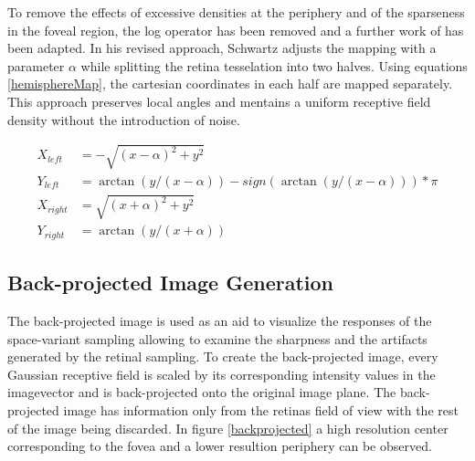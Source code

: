 \documentclass{l4proj}
\begin{document}
To remove the effects of excessive densities at the periphery and of the sparseness in the foveal region, the log operator has been removed and a further work of \citet{Schwartz1980} has been adapted. In his revised approach, Schwartz adjusts the mapping with a parameter $\alpha$ while splitting the retina tesselation into two halves. Using equations \ref{hemisphereMap}, the cartesian coordinates in each half are mapped separately. This approach preserves local angles and mentains a uniform receptive field density without the introduction of noise. 




\begin{align}
    X_{left}  &= -\sqrt{(x-\alpha)^2+y^2}\\ \nonumber
    Y_{left}  &= \arctan(y/(x-\alpha)) - sign(\arctan(y/(x-\alpha)))*\pi\\ \nonumber
    X_{right} &= \sqrt{(x+\alpha)^2+y^2}\\ \nonumber
    Y_{right} &= \arctan(y/(x+\alpha)) 
    \label{hemisphereMap}
\end{align}



\subsection{Back-projected Image Generation}

The back-projected image is used as an aid to visualize the responses of the space-variant sampling allowing to examine the sharpness and the artifacts generated by the retinal sampling. To create the back-projected image, every Gaussian receptive field is scaled by its corresponding intensity values in the imagevector and is back-projected onto the original image plane. The back-projected image has information only from the retinas field of view with the rest of the image being discarded. In figure \ref{backprojected} a high resolution center corresponding to the fovea and a lower resultion periphery can be observed. 
\end{document}
